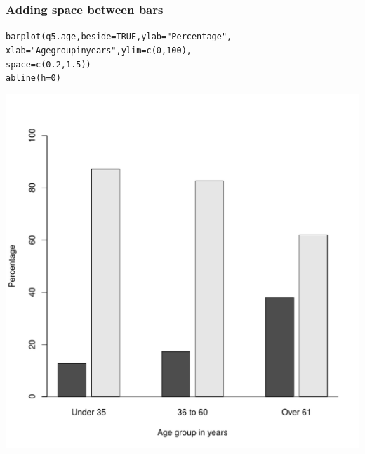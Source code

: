 \documentclass{beamer}\usepackage[]{graphicx}\usepackage[]{color}
\makeatletter
\newcommand{\hlnum}[1]{\textcolor[rgb]{0.533,0,0.133}{#1}}%
\newcommand{\hlstr}[1]{\textcolor[rgb]{0.667,0.267,0}{#1}}%
\newcommand{\hlstd}[1]{\textcolor[rgb]{0,0,0}{#1}}%
\newcommand{\hlkwc}[1]{\textcolor[rgb]{0,0,0.4}{#1}}%
\newcommand{\hlkwd}[1]{\textcolor[rgb]{0,0.267,0.4}{#1}}%
\newenvironment{kframe}{%
 \def\at@end@of@kframe{}%
 \ifinner\ifhmode%
  \def\at@end@of@kframe{\end{minipage}}%
  \begin{minipage}{\columnwidth}%
 \fi\fi%
 \def\FrameCommand##1{\hskip\@totalleftmargin \hskip-\fboxsep
 \colorbox{shadecolor}{##1}\hskip-\fboxsep
     \hskip-\linewidth \hskip-\@totalleftmargin \hskip\columnwidth}%
 \MakeFramed {\advance\hsize-\width
   \@totalleftmargin\z@ \linewidth\hsize
   \@setminipage}}%
 {\par\unskip\endMakeFramed%
 \at@end@of@kframe}
\newenvironment{knitrout}{}{} %
\makeatother
\begin{document}
\begin{frame}[fragile]
  \frametitle{Adding space between bars}
\begin{knitrout}
\color{fgcolor}\begin{kframe}
\begin{alltt}
\hlkwd{barplot}\hlstd{(q5.age,} \hlkwc{beside} \hlstd{=} \hlnum{TRUE}\hlstd{,} \hlkwc{ylab} \hlstd{=} \hlstr{"Percentage"}\hlstd{,}
        \hlkwc{xlab} \hlstd{=} \hlstr{"Age group in years"}\hlstd{,} \hlkwc{ylim} \hlstd{=} \hlkwd{c}\hlstd{(}\hlnum{0}\hlstd{,} \hlnum{100}\hlstd{),}
        \hlkwc{space} \hlstd{=} \hlkwd{c}\hlstd{(}\hlnum{0.2}\hlstd{,} \hlnum{1.5}\hlstd{))}
\hlkwd{abline}\hlstd{(}\hlkwc{h} \hlstd{=} \hlnum{0}\hlstd{)}
\end{alltt}
\end{kframe}

{\centering \includegraphics[width=0.45\linewidth]{figure/bar3-1} 

}



\end{knitrout}
\end{frame}
\end{document}
